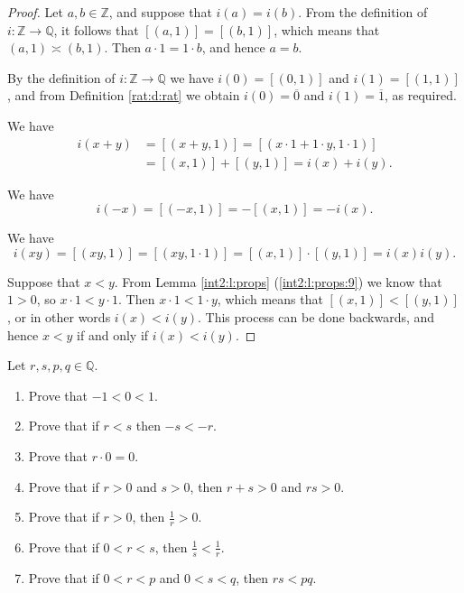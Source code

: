 \begin{proof}
	\hfill

	Let $a, b \in \mathbb{Z}$, and suppose that $i(a) = i(b)$. From the definition of $i: \mathbb{Z} \to \mathbb{Q}$, it follows that $[(a, 1)] = [(b, 1)]$, which means that $(a, 1) \asymp (b, 1)$. Then $a \cdot 1 = 1 \cdot b$, and hence $a = b$.

	By the definition of $i: \mathbb{Z} \to \mathbb{Q}$ we have $i(0) = [(0, 1)]$ and $i(1) = [(1, 1)]$, and from Definition \ref{rat:d:rat} we obtain $i(0) = \overline{0}$ and $i(1) = \overline{1}$, as required.

	We have
	\begin{align*}
		i(x + y) & = [(x + y, 1)] = [(x \cdot 1 + 1 \cdot y, 1 \cdot 1)] \\
		         & = [(x, 1)] + [(y, 1)] = i(x) + i(y).
	\end{align*}

	We have
	$$
		i(-x) = [(-x, 1)] = -[(x, 1)] = -i(x).
	$$

	We have
	$$
		i(xy) = [(xy, 1)] = [(xy, 1 \cdot 1)] = [(x, 1)] \cdot [(y, 1)] = i(x)i(y).
	$$

	Suppose that $x < y$. From Lemma \ref{int2:l:props} (\ref{int2:l:props:9}) we know that $1 > 0$, so ${x \cdot 1 < y \cdot 1}$. Then $x \cdot 1 < 1 \cdot y$, which means that $[(x, 1)] < [(y, 1)]$, or in other words $i(x) < i(y)$. This process can be done backwards, and hence $x < y$ if and only if $i(x) < i(y)$.
\end{proof}


\Newpage

\begin{exercise} %
	\label{rat:e:6}
	Let ${r, s, p, q \in \mathbb{Q}}$.
	\begin{enumerate}
		\item Prove that $-1 < 0 < 1$. \label{rat:e:6:1}
		\item Prove that if $r < s$ then $-s < -r$. \label{rat:e:6:2}
		\item Prove that $r \cdot 0 = 0$. \label{rat:e:6:3}
		\item Prove that if $r > 0$ and $s > 0$, then $r + s > 0$ and $r s > 0$. \label{rat:e:6:4}
		\item Prove that if $r > 0$, then $\frac{1}{r} > 0$. \label{rat:e:6:5}
		\item Prove that if $0 < r < s$, then $\frac{1}{s} < \frac{1}{r}$. \label{rat:e:6:6}
		\item Prove that if $0 < r < p$ and $0 < s < q$, then $r s < p q$. \label{rat:e:6:7}
	\end{enumerate}
\end{exercise}

